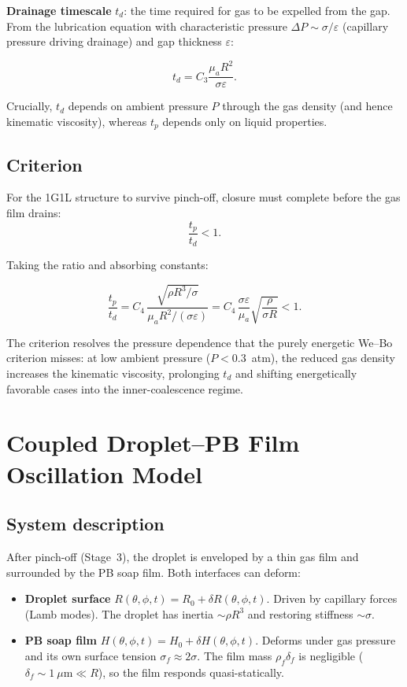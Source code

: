 \documentclass[%
 preprint,
 superscriptaddress,
 amsmath,amssymb,
 aps, prl,
]{revtex4-2}
\begin{document}
\textbf{Drainage timescale} $t_d$: the time required for gas to be expelled
from the gap.  From the lubrication equation with characteristic pressure
$\Delta P \sim \sigma/\varepsilon$ (capillary pressure driving drainage)
and gap thickness $\varepsilon$:

\begin{equation}
t_d = C_3 \frac{\mu_a R^2}{\sigma\varepsilon}.
\end{equation}

Crucially, $t_d$ depends on ambient pressure $P$ through the gas density
(and hence kinematic viscosity), whereas $t_p$ depends only on liquid properties.

\subsection{Criterion}

For the 1G1L structure to survive pinch-off, closure must complete before
the gas film drains:
\begin{equation}
\frac{t_p}{t_d} < 1.
\end{equation}

Taking the ratio and absorbing constants:

\begin{equation}
\boxed{\frac{t_p}{t_d}
= C_4\,
\frac{\sqrt{\rho R^3/\sigma}}{\mu_a R^2/(\sigma\varepsilon)}
= C_4\,\frac{\sigma\varepsilon}{\mu_a}\sqrt{\frac{\rho}{\sigma R}}
< 1.}
\end{equation}

The criterion resolves the pressure dependence that the purely energetic
We--Bo criterion misses: at low ambient pressure ($P < 0.3$~atm),
the reduced gas density increases the kinematic viscosity, prolonging
$t_d$ and shifting energetically favorable cases into the inner-coalescence regime.

\section{Coupled Droplet--PB Film Oscillation Model}

\subsection{System description}

After pinch-off (Stage~3), the droplet is enveloped by a thin gas film
and surrounded by the PB soap film.  Both interfaces can deform:

\begin{itemize}
\item \textbf{Droplet surface} $R(\theta, \phi, t) = R_0 + \delta R(\theta, \phi, t)$.
      Driven by capillary forces (Lamb modes).  The droplet has inertia
      $\sim \rho R^3$ and restoring stiffness $\sim \sigma$.

\item \textbf{PB soap film} $H(\theta, \phi, t) = H_0 + \delta H(\theta, \phi, t)$.
      Deforms under gas pressure and its own surface tension $\sigma_f \approx 2\sigma$.
      The film mass $\rho_f \delta_f$ is negligible ($\delta_f \sim 1~\mu\text{m}
      \ll R$), so the film responds quasi-statically.
\end{itemize}
\end{document}
